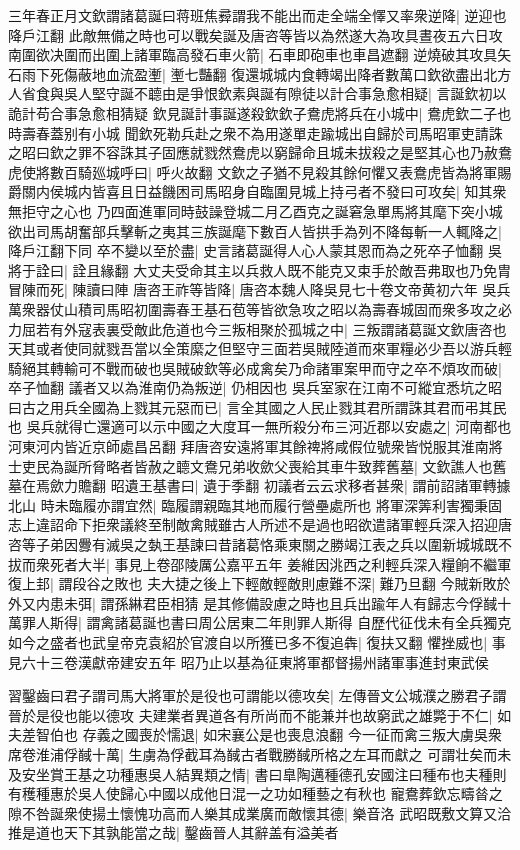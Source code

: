 三年春正月文欽謂諸葛誕曰蒋班焦彛謂我不能出而走全端全懌又率衆逆降|{
	逆迎也降戶江翻}
此敵無備之時也可以戰矣誕及唐咨等皆以為然遂大為攻具晝夜五六日攻南圍欲决圍而出圍上諸軍臨高發石車火箭|{
	石車即砲車也車昌遮翻}
逆燒破其攻具矢石雨下死傷蔽地血流盈壍|{
	壍七豔翻}
復還城城内食轉竭出降者數萬口欽欲盡出北方人省食與吳人堅守誕不聼由是爭恨欽素與誕有隙徒以計合事急愈相疑|{
	言誕欽初以詭計苟合事急愈相猜疑}
欽見誕計事誕遂殺欽欽子鴦虎將兵在小城中|{
	鴦虎欽二子也時壽春蓋别有小城}
聞欽死勒兵赴之衆不為用遂單走踰城出自歸於司馬昭軍吏請誅之昭曰欽之罪不容誅其子固應就戮然鴦虎以窮歸命且城未拔殺之是堅其心也乃赦鴦虎使將數百騎廵城呼曰|{
	呼火故翻}
文欽之子猶不見殺其餘何懼又表鴦虎皆為將軍賜爵關内侯城内皆喜且日益饑困司馬昭身自臨圍見城上持弓者不發曰可攻矣|{
	知其衆無拒守之心也}
乃四面進軍同時鼓譟登城二月乙酉克之誕窘急單馬將其麾下突小城欲出司馬胡奮部兵擊斬之夷其三族誕麾下數百人皆拱手為列不降每斬一人輒降之|{
	降戶江翻下同}
卒不變以至於盡|{
	史言諸葛誕得人心人蒙其恩而為之死卒子恤翻}
吳將于詮曰|{
	詮且緣翻}
大丈夫受命其主以兵救人既不能克又束手於敵吾弗取也乃免胄冒陳而死|{
	陳讀曰陣}
唐咨王祚等皆降|{
	唐咨本魏人降吳見七十卷文帝黄初六年}
吳兵萬衆器仗山積司馬昭初圍壽春王基石苞等皆欲急攻之昭以為壽春城固而衆多攻之必力屈若有外寇表裏受敵此危道也今三叛相聚於孤城之中|{
	三叛謂諸葛誕文欽唐咨也}
天其或者使同就戮吾當以全策縻之但堅守三面若吳賊陸道而來軍糧必少吾以游兵輕騎絕其轉輸可不戰而破也吳賊破欽等必成禽矣乃命諸軍案甲而守之卒不煩攻而破|{
	卒子恤翻}
議者又以為淮南仍為叛逆|{
	仍相因也}
吳兵室家在江南不可縱宜悉坑之昭曰古之用兵全國為上戮其元惡而已|{
	言全其國之人民止戮其君所謂誅其君而弔其民也}
吳兵就得亡還適可以示中國之大度耳一無所殺分布三河近郡以安處之|{
	河南都也河東河内皆近京師處昌呂翻}
拜唐咨安遠將軍其餘禆將咸假位號衆皆悦服其淮南將士吏民為誕所脅略者皆赦之聼文鴦兄弟收歛父喪給其車牛致葬舊墓|{
	文欽譙人也舊墓在焉歛力贍翻}
昭遺王基書曰|{
	遺于季翻}
初議者云云求移者甚衆|{
	謂前詔諸軍轉據北山}
時未臨履亦謂宜然|{
	臨履謂親臨其地而履行營壘處所也}
將軍深筭利害獨秉固志上違詔命下拒衆議終至制敵禽賊雖古人所述不是過也昭欲遣諸軍輕兵深入招迎唐咨等子弟因釁有滅吳之埶王基諫曰昔諸葛恪乘東關之勝竭江表之兵以圍新城城既不拔而衆死者大半|{
	事見上卷邵陵厲公嘉平五年}
姜維因洮西之利輕兵深入糧餉不繼軍復上邽|{
	謂段谷之敗也}
夫大捷之後上下輕敵輕敵則慮難不深|{
	難乃旦翻}
今賊新敗於外又内患未弭|{
	謂孫綝君臣相猜}
是其修備設慮之時也且兵出踰年人有歸志今俘馘十萬罪人斯得|{
	謂禽諸葛誕也書曰周公居東二年則罪人斯得}
自歷代征伐未有全兵獨克如今之盛者也武皇帝克袁紹於官渡自以所獲已多不復追犇|{
	復扶又翻}
懼挫威也|{
	事見六十三卷漢獻帝建安五年}
昭乃止以基為征東將軍都督揚州諸軍事進封東武侯

習鑿齒曰君子謂司馬大將軍於是役也可謂能以德攻矣|{
	左傳晉文公城濮之勝君子謂晉於是役也能以德攻}
夫建業者異道各有所尚而不能兼并也故窮武之雄斃于不仁|{
	如夫差智伯也}
存義之國喪於懦退|{
	如宋襄公是也喪息浪翻}
今一征而禽三叛大虜吳衆席卷淮浦俘馘十萬|{
	生虜為俘截耳為馘古者戰勝馘所格之左耳而獻之}
可謂壮矣而未及安坐賞王基之功種惠吳人結異類之情|{
	書曰臯陶邁種德孔安國注曰種布也夫種則有穫種惠於吳人使歸心中國以成他日混一之功如種藝之有秋也}
寵鴦葬欽忘疇㫺之隙不咎誕衆使揚土懷愧功高而人樂其成業廣而敵懷其德|{
	樂音洛}
武昭既敷文算又洽推是道也天下其孰能當之哉|{
	鑿齒晉人其辭盖有溢美者}


